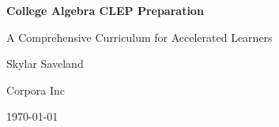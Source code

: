 \begin{titlepage}
    \centering
    \vspace*{1in}
    {\Huge\bfseries College Algebra CLEP Preparation\par}
    {\Large A Comprehensive Curriculum for Accelerated Learners\par}
    \vspace{1in}
    {\Large Skylar Saveland\par}
    {\Large Corpora Inc\par}
    \vfill
    {\large \today\par}
\end{titlepage}
